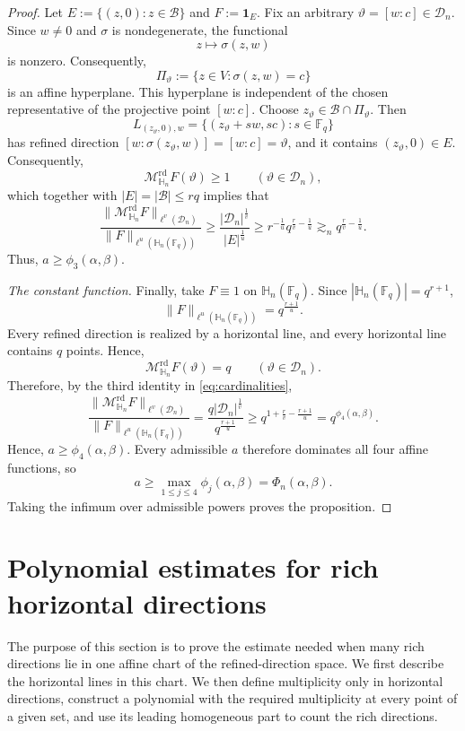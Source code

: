 \documentclass[11pt,letterpaper]{amsart}
\numberwithin{equation}{section}
\theoremstyle{definition}
\theoremstyle{remark}
\newcommand{\Fq}{\mathbb F_q}
\newcommand{\HH}{\mathbb H}
\newcommand{\Dn}{\mathcal D_n}
\newcommand{\Mrd}{\mathcal M^{\mathrm{rd}}_{\HH_n}}
\newcommand{\one}{\mathbf 1}
\newcommand{\norm}[1]{\lVert #1\rVert}
\begin{document}
\begin{proof}
Let $E:=\{(z,0): z\in\mathcal B\}$ and $F:=\one_E$. 
Fix an arbitrary $\vartheta=[w:c]\in\Dn$. Since
$w\neq0$ and $\sigma$ is nondegenerate, the functional
\[
 z\longmapsto\sigma(z,w)
\]
is nonzero. Consequently,
\[
 \Pi_\vartheta
 :=\{z\in V:\sigma(z, w)=c\}
\]
is an affine hyperplane. This hyperplane is independent of the chosen representative of the projective point $[w:c]$. Choose $z_\vartheta\in\mathcal B\cap\Pi_\vartheta$. Then
\begin{equation}\label{eq:witnessing-line-final}
 L_{(z_\vartheta,0), w}
 =
 \{(z_\vartheta+sw,sc):s\in\Fq\}
\end{equation}
has refined direction $
 [w:\sigma(z_\vartheta,w)]
 =[w:c]
 =\vartheta$, 
and it contains $(z_\vartheta,0)\in E$. Consequently,
\[
 \Mrd F(\vartheta)\geq1
 \qquad(\vartheta\in\Dn),
\]
which together with $|E|=|\mathcal{B}| \leq r q$ implies that
\[
 \frac{\norm{\Mrd F}_{\ell^v(\Dn)}}
      {\norm{F}_{\ell^u(\HH_n(\Fq))}}
      \geq
 \frac{|\Dn|^{\frac{1}{v}}}{|E|^{\frac{1}{u}}}
 \geq
 r^{-\frac{1}{u}}q^{\frac{r}{v}-\frac{1}{u}}
 \gtrsim_n q^{\frac{r}{v}-\frac{1}{u}}.
\]
Thus, $a\geq\phi_3(\alpha,\beta)$.


\emph{The constant function.}
Finally, take $F\equiv1$ on $\HH_n(\Fq)$. Since
$|\HH_n(\Fq)|=q^{r+1}$,
\[
 \norm{F}_{\ell^u(\HH_n(\Fq))}
 =q^{\frac{r+1}{u}}.
\]
Every refined direction is realized by a horizontal line, and every
horizontal line contains $q$ points. Hence,
\[
 \Mrd F(\vartheta)=q
 \qquad(\vartheta\in\Dn).
\]
Therefore, by the third identity in \eqref{eq:cardinalities},
\[
 \frac{\norm{\Mrd F}_{\ell^v(\Dn)}}
      {\norm{F}_{\ell^u(\HH_n(\Fq))}}
 =
 \frac{q|\Dn|^{\frac{1}{v}}}{q^{\frac{r+1}{u}}}
 \geq
 q^{1+\frac{r}{v}-\frac{r+1}{u}}
 =
 q^{\phi_4(\alpha,\beta)}.
\]
Hence, $a\geq\phi_4(\alpha,\beta)$. Every admissible $a$ therefore
dominates all four affine functions, so
\[
 a\geq\max_{1\leq j\leq4}\phi_j(\alpha,\beta)
 =\Phi_n(\alpha,\beta).
\]
Taking the infimum over admissible powers proves the proposition.
\end{proof}




\section{Polynomial estimates for rich horizontal directions}
\label{sec:polynomial-estimate}


The purpose of this section is to prove the estimate needed when many rich directions lie in one affine chart of the refined-direction space. We first describe the horizontal lines in this chart. We then define multiplicity only in horizontal directions, construct a polynomial with the required multiplicity at every point of a given set, and use its leading homogeneous part to count the rich directions.
\end{document}
